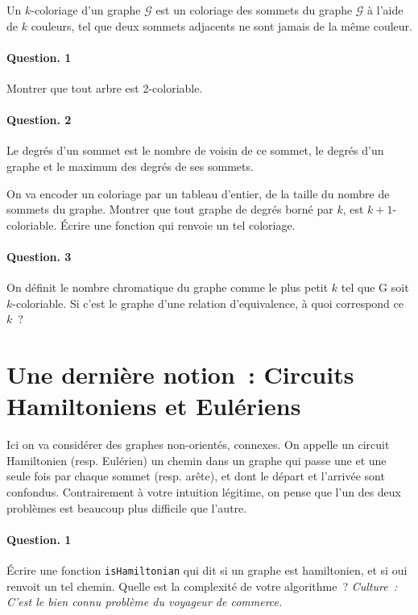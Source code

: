 \documentclass[10pt,a4paper]{article}
\begin{document}
Un $k$-coloriage d'un graphe $\mathcal{G}$ est un coloriage des sommets du 
graphe $\mathcal{G}$ à
l'aide de $k$ couleurs, tel que deux sommets adjacents ne sont jamais de la
même couleur.

\paragraph{Question. 1\\}
Montrer que tout arbre est 2-coloriable.

\paragraph{Question. 2\\}Le degrés d'un sommet est le nombre de voisin
de ce sommet, le degrés d'un graphe et le maximum des degrés de ses
sommets.

On va encoder un coloriage par un tableau d'entier, de la taille du
nombre de sommets du graphe. Montrer que tout graphe de degrés borné par
$k$, est $k+1$-coloriable. Écrire une fonction qui renvoie un tel coloriage. 

\paragraph{Question. 3\\}
On définit le nombre chromatique du graphe comme le plus petit $k$ tel que
G soit $k$-coloriable. Si c'est le graphe d'une relation d'equivalence, à quoi
correspond ce $k$~?

\section{Une dernière notion~: Circuits Hamiltoniens et Eulériens}
Ici on va considérer des graphes non-orientés, connexes.
On appelle un circuit Hamiltonien (resp. Eulérien) un chemin dans un graphe qui passe une
et une seule fois par chaque sommet (resp. arête), et dont le départ et l'arrivée
sont confondus. Contrairement à votre
intuition légitime, on pense
que l'un des deux problèmes est beaucoup plus difficile que l'autre. 

\paragraph{Question. 1\\} Écrire une fonction \texttt{isHamiltonian} qui
dit si un graphe est hamiltonien, et si oui renvoit un tel chemin.
Quelle est la complexité de votre algorithme~? \emph{Culture~: C'est le
bien connu problème du voyageur de commerce.}
\end{document}
